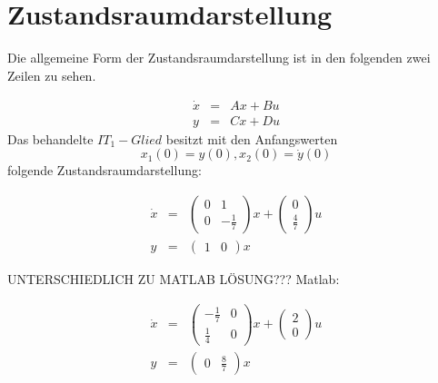 \section{Zustandsraumdarstellung}

Die allgemeine Form der Zustandsraumdarstellung ist in den folgenden zwei Zeilen zu sehen.

\begin{eqnarray*}
	\dot x &=& Ax + Bu \\
	y &=& Cx + Du
\end{eqnarray*}
\noindent
Das behandelte $IT_1-Glied$ besitzt mit den Anfangswerten \[x_1(0) = y(0),  x_2(0) = \dot y(0)\] folgende Zustandsraumdarstellung:

\begin{eqnarray*}
	\dot x &=& \left(\begin{array}{cc} 0 & 1\\ 0 & -\frac{1}{7}\end{array}\right) x + \left(\begin{array}{c} 0\\ \frac{4}{7}\end{array}\right) u \\
	y &=& \left(\begin{array}{cc} 1 & 0\end{array}\right) x
\end{eqnarray*} 




UNTERSCHIEDLICH ZU MATLAB LÖSUNG???
Matlab:

\begin{eqnarray*}
	\dot x &=& \left(\begin{array}{cc} -\frac{1}{7} & 0\\ \frac{1}{4} & 0\end{array}\right) x + \left(\begin{array}{c} 2\\ 0\end{array}\right) u  \\
	y &=& \left(\begin{array}{cc} 0 & \frac{8}{7}\end{array}\right) x
\end{eqnarray*}